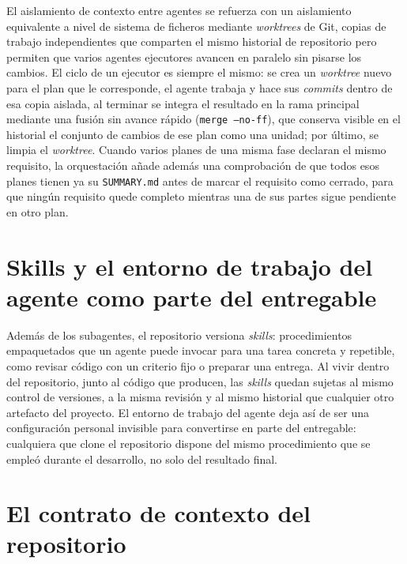 El aislamiento de contexto entre agentes se refuerza con un aislamiento equivalente a nivel de
sistema de ficheros mediante \textit{worktrees} de Git, copias de trabajo independientes que
comparten el mismo historial de repositorio pero permiten que varios agentes ejecutores avancen
en paralelo sin pisarse los cambios. El ciclo de un ejecutor es siempre el mismo: se crea un
\textit{worktree} nuevo para el plan que le corresponde, el agente trabaja y hace sus
\textit{commits} dentro de esa copia aislada, al terminar se integra el resultado en la rama
principal mediante una fusión sin avance rápido (\texttt{merge --no-ff}), que conserva visible
en el historial el conjunto de cambios de ese plan como una unidad; por último, se limpia el
\textit{worktree}. Cuando varios planes de una misma fase declaran el mismo requisito, la
orquestación añade además una comprobación de que todos esos planes tienen ya su
\texttt{SUMMARY.md} antes de marcar el requisito como cerrado, para que ningún requisito quede
completo mientras una de sus partes sigue pendiente en otro plan.

\section{Skills y el entorno de trabajo del agente como parte del entregable}\label{sec:gestion-skills}

Además de los subagentes, el repositorio versiona \textit{skills}: procedimientos empaquetados
que un agente puede invocar para una tarea concreta y repetible, como revisar código con un
criterio fijo o preparar una entrega. Al vivir dentro del repositorio, junto al código que
producen, las \textit{skills} quedan sujetas al mismo control de versiones, a la misma revisión
y al mismo historial que cualquier otro artefacto del proyecto. El entorno de trabajo del
agente deja así de ser una configuración personal invisible para convertirse en parte del
entregable: cualquiera que clone el repositorio dispone del mismo procedimiento que se empleó
durante el desarrollo, no solo del resultado final.

\section{El contrato de contexto del repositorio}\label{sec:gestion-contrato}

